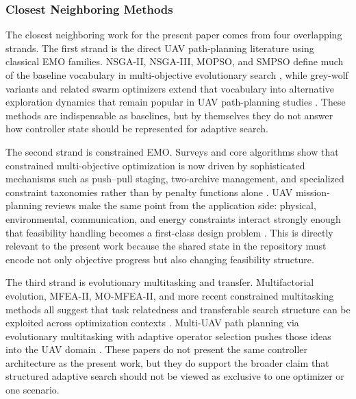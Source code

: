 \documentclass[a4paper,fleqn]{cas-dc}
\begin{document}
\subsubsection{Closest Neighboring Methods}

The closest neighboring work for the present paper comes from four overlapping strands. The first strand is the direct UAV path-planning literature using classical EMO families. NSGA-II, NSGA-III, MOPSO, and SMPSO define much of the baseline vocabulary in multi-objective evolutionary search \cite{ref36,ref37,ref38,ref39}, while grey-wolf variants and related swarm optimizers extend that vocabulary into alternative exploration dynamics that remain popular in UAV path-planning studies \cite{ref40,ref41}. These methods are indispensable as baselines, but by themselves they do not answer how controller state should be represented for adaptive search.

The second strand is constrained EMO. Surveys and core algorithms show that constrained multi-objective optimization is now driven by sophisticated mechanisms such as push--pull staging, two-archive management, and specialized constraint taxonomies rather than by penalty functions alone \cite{ref33,ref34,ref35,ref42,ref43,ref48}. UAV mission-planning reviews make the same point from the application side: physical, environmental, communication, and energy constraints interact strongly enough that feasibility handling becomes a first-class design problem \cite{ref33}. This is directly relevant to the present work because the shared state in the repository must encode not only objective progress but also changing feasibility structure.

The third strand is evolutionary multitasking and transfer. Multifactorial evolution, MFEA-II, MO-MFEA-II, and more recent constrained multitasking methods all suggest that task relatedness and transferable search structure can be exploited across optimization contexts \cite{ref44,ref45,ref46,ref47}. Multi-UAV path planning via evolutionary multitasking with adaptive operator selection pushes those ideas into the UAV domain \cite{ref19}. These papers do not present the same controller architecture as the present work, but they do support the broader claim that structured adaptive search should not be viewed as exclusive to one optimizer or one scenario.
\end{document}
